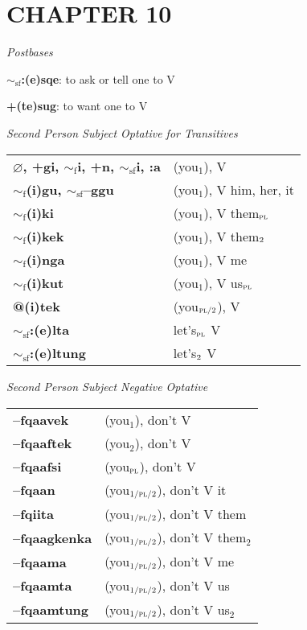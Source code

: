 \documentclass{article}
\begin{document}
\section{CHAPTER 10}

\textit{Postbases}
\begin{description}
\item \textbf{$\sim_\text{sf}$:(e)sqe}: to ask or tell one to V
\item \textbf{+(te)sug}: to want one to V
\end{description}

\bigskip

\textit{Second Person Subject Optative for Transitives}

\begin{tabular}{ l l }
\textbf{$\varnothing$, +gi, $\sim_\text{f}$i, +n, $\sim_\text{sf}$i, :a} & (you$_1$), V \\
\textbf{$\sim_\text{f}$(i)gu, $\sim_\text{sf}$--ggu} & (you$_1$), V him, her, it \\
\textbf{$\sim_\text{f}$(i)ki} & (you$_1$), V them$_\text{\textsc{pl}}$ \\
\textbf{$\sim_\text{f}$(i)kek} & (you$_1$), V them$_\text{\textsc{2}}$ \\
\textbf{$\sim_\text{f}$(i)nga} & (you$_1$), V me \\
\textbf{$\sim_\text{f}$(i)kut} & (you$_1$), V us$_\text{\textsc{pl}}$ \\
\textbf{@(i)tek} & (you$_\text{\textsc{pl/2}}$), V \\
\textbf{$\sim_\text{sf}$:(e)lta} & let's$_\text{\textsc{pl}}$ V \\
\textbf{$\sim_\text{sf}$:(e)ltung} & let's$_\text{\textsc{2}}$ V
\end{tabular}

\bigskip

\textit{Second Person Subject Negative Optative}

\begin{tabular}{ l l }
\textbf{--fqaavek} & (you$_1$), don't V \\
\textbf{--fqaaftek} & (you$_2$), don't V \\
\textbf{--fqaafsi} & (you$_\text{\textsc{pl}}$), don't V \\
\textbf{--fqaan} & (you$_\text{\textsc{1/pl/2}}$), don't V it \\
\textbf{--fqiita} & (you$_\text{\textsc{1/pl/2}}$), don't V them \\
\textbf{--fqaagkenka} & (you$_\text{\textsc{1/pl/2}}$), don't V them$_2$ \\
\textbf{--fqaama} & (you$_\text{\textsc{1/pl/2}}$), don't V me \\
\textbf{--fqaamta} & (you$_\text{\textsc{1/pl/2}}$), don't V us \\
\textbf{--fqaamtung} & (you$_\text{\textsc{1/pl/2}}$), don't V us$_2$
\end{tabular}
\end{document}
